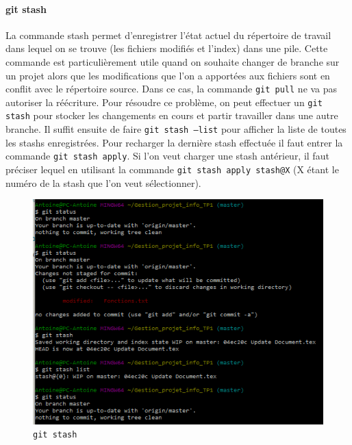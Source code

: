 \documentclass[11pt,canadien]{article}
\begin{document}
\paragraph{git stash}La commande stash permet d'enregistrer l'état actuel du répertoire de travail dans lequel on se trouve (les fichiers modifiés et l'index) dans une pile. Cette commande est particulièrement utile quand on souhaite changer de branche sur un projet alors que les modifications que l'on a apportées aux fichiers sont en conflit avec le répertoire source. Dans ce cas, la commande \texttt{git pull} ne va pas autoriser la réécriture. Pour résoudre ce problème, on peut effectuer un \texttt{git stash} pour stocker les changements en cours et partir travailler dans une autre branche. Il suffit ensuite de faire \texttt{git stash --list} pour afficher la liste de toutes les stashs enregistrées. Pour recharger la dernière stash effectuée il faut entrer la commande \texttt{git stash apply}. Si l'on veut charger une stash antérieur, il faut préciser lequel en utilisant la commande \texttt{git stash apply stash@{X}} (X étant le numéro de la stash que l'on veut sélectionner).
\begin{figure}
	\centering
	\includegraphics{images/git_stash.png}
	\caption{\texttt{git stash}}
	\label{fig:git_stash}
\end{figure}
\end{document}
